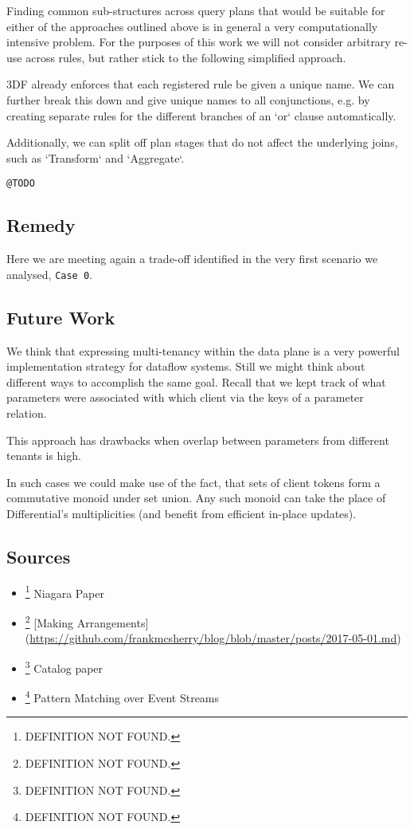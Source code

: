 \documentclass[../catalog.tex]{subfiles}
\begin{document}
Finding common sub-structures across query plans that would be
suitable for either of the approaches outlined above is in general a
very computationally intensive problem. For the purposes of this work
we will not consider arbitrary re-use across rules, but rather stick
to the following simplified approach.

3DF already enforces that each registered rule be given a unique
name. We can further break this down and give unique names to all
conjunctions, e.g. by creating separate rules for the different
branches of an `or` clause automatically.

Additionally, we can split off plan stages that do not affect the
underlying joins, such as `Transform` and `Aggregate`.

\texttt{@TODO}

\subsection{Remedy}

Here we are meeting again a trade-off identified in the very first
scenario we analysed, \texttt{Case 0}.

\subsection{Future Work}

We think that expressing multi-tenancy within the data plane is a very
powerful implementation strategy for dataflow systems. Still we might
think about different ways to accomplish the same goal. Recall that we
kept track of what parameters were associated with which client via
the keys of a parameter relation.

This approach has drawbacks when overlap between parameters from
different tenants is high.

In such cases we could make use of the fact, that sets of client
tokens form a commutative monoid under set union. Any such monoid can
take the place of Differential's multiplicities (and benefit from
efficient in-place updates).

\subsection{Sources}

\begin{itemize}
\item \footnote{DEFINITION NOT FOUND.} Niagara Paper
\item \footnote{DEFINITION NOT FOUND.} [Making Arrangements](\url{https://github.com/frankmcsherry/blog/blob/master/posts/2017-05-01.md})
\item \footnote{DEFINITION NOT FOUND.} Catalog paper
\item \footnote{DEFINITION NOT FOUND.} Pattern Matching over Event Streams
\end{itemize}
\end{document}
